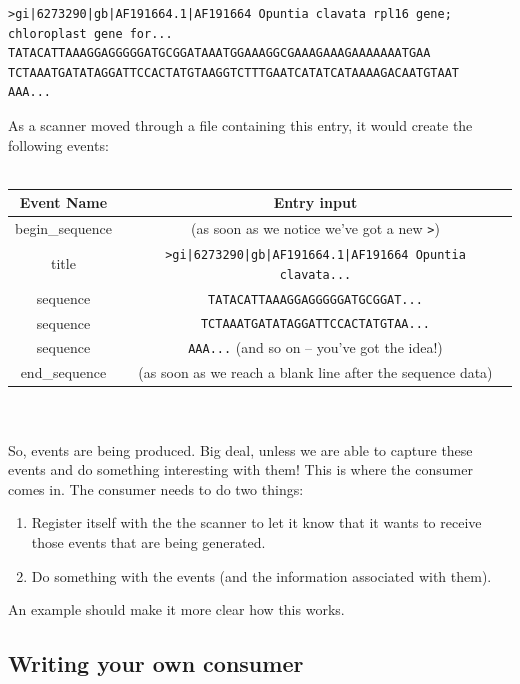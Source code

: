 \documentclass{report}
\begin{document}
\begin{verbatim}
>gi|6273290|gb|AF191664.1|AF191664 Opuntia clavata rpl16 gene; chloroplast gene for...
TATACATTAAAGGAGGGGGATGCGGATAAATGGAAAGGCGAAAGAAAGAAAAAAATGAA
TCTAAATGATATAGGATTCCACTATGTAAGGTCTTTGAATCATATCATAAAAGACAATGTAAT
AAA...
\end{verbatim}

As a scanner moved through a file containing this entry, it would create the following events:
\\
\\
\begin{tabular}{cc}
Event Name & Entry input \\
\hline
begin\_sequence & (as soon as we notice we've got a new \verb|>|) \\
title & \verb+>gi|6273290|gb|AF191664.1|AF191664 Opuntia clavata...+ \\
sequence & \verb|TATACATTAAAGGAGGGGGATGCGGAT...| \\
sequence & \verb|TCTAAATGATATAGGATTCCACTATGTAA...| \\
sequence & \verb|AAA...| (and so on -- you've got the idea!) \\
end\_sequence & (as soon as we reach a blank line after the sequence data) \\

\end{tabular}
\\
\\
So, events are being produced. Big deal, unless we are able to capture these events and do something interesting with them! This is where the consumer comes in. The consumer needs to do two things:

\begin{enumerate}

\item Register itself with the the scanner to let it know that it wants to receive those events that are being generated.

\item Do something with the events (and the information associated with them).

\end{enumerate}

An example should make it more clear how this works.

\subsection{Writing your own consumer}
\label{sec:writing_consumer}
\end{document}
